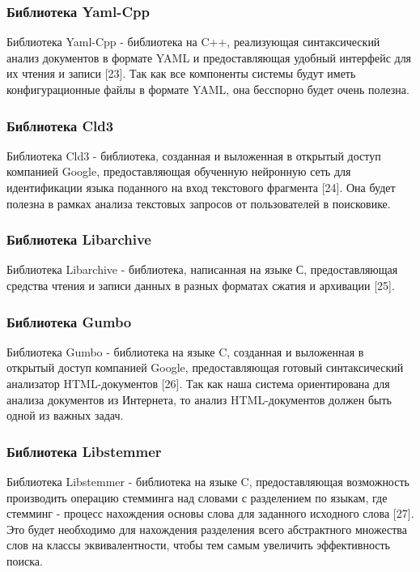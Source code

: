 \subsubsection{Библиотека Yaml-Cpp}

Библиотека Yaml-Cpp - библиотека на C++, реализующая синтаксический анализ документов в формате YAML и предоставляющая удобный интерфейс для их чтения и записи [23]. Так как все компоненты системы будут иметь конфигурационные файлы в формате YAML, она бесспорно будет очень полезна.

\subsubsection{Библиотека Cld3}

Библиотека Cld3 - библиотека, созданная и выложенная в открытый доступ компанией Google, предоставляющая обученную нейронную сеть для идентификации языка поданного на вход текстового фрагмента [24]. Она будет полезна в рамках анализа текстовых запросов от пользователей в поисковике.

\subsubsection{Библиотека Libarchive}

Библиотека Libarchive - библиотека, написанная на языке С, предоставляющая средства чтения и записи данных в разных форматах сжатия и архивации [25].

\subsubsection{Библиотека Gumbo}

Библиотека Gumbo - библиотека на языке C, созданная и выложенная в открытый доступ компанией Google, предоставляющая готовый синтаксический анализатор HTML-документов [26]. Так как наша система ориентирована для анализа документов из Интернета, то анализ HTML-документов должен быть одной из важных задач. 

\subsubsection{Библиотека Libstemmer}

Библиотека Libstemmer - библиотека на языке C, предоставляющая возможность производить операцию стемминга над словами с разделением по языкам, где стемминг - процесс нахождения основы слова для заданного исходного слова [27]. Это будет необходимо для нахождения разделения всего абстрактного множества слов на классы эквивалентности, чтобы тем самым увеличить эффективность поиска. 

